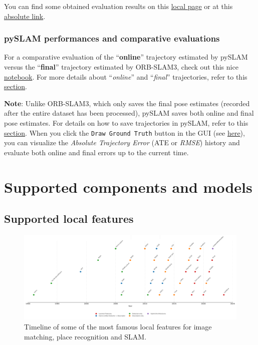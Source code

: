 \documentclass{article}
\begin{document}
You can find some obtained evaluation results on this 
\href{./docs/evaluations/evaluations.md}{local page} or at this \href{https://github.com/luigifreda/pyslam/blob/master/docs/evaluations/evaluations.md}{absolute link}.

\hypertarget{pyslam-performances-and-comparative-evaluations}{%
\subsubsection{pySLAM performances and comparative
evaluations}\label{pyslam-performances-and-comparative-evaluations}}

For a comparative evaluation of the ``\textbf{online}'' trajectory
estimated by pySLAM versus the ``\textbf{final}'' trajectory estimated
by ORB-SLAM3, check out this nice
\href{https://github.com/anathonic/Trajectory-Comparison-ORB-SLAM3-pySLAM/blob/main/trajectories_comparison.ipynb}{notebook}.
For more details about ``\emph{online}'' and ``\emph{final}''
trajectories, refer to this
\protect\hyperlink{trajectory-saving}{section}.

\textbf{Note}: Unlike ORB-SLAM3, which only saves the final pose
estimates (recorded after the entire dataset has been processed), pySLAM
saves both online and final pose estimates. For details on how to save
trajectories in pySLAM, refer to this
\protect\hyperlink{trajectory-saving}{section}. When you click the
\texttt{Draw\ Ground\ Truth} button in the GUI (see
\protect\hyperlink{slam-gui}{here}), you can visualize the
\emph{Absolute Trajectory Error} (ATE or \emph{RMSE}) history and
evaluate both online and final errors up to the current time.

\hypertarget{supported-components-and-models}{%
\section{Supported components and
models}\label{supported-components-and-models}}

\hypertarget{supported-local-features}{%
\subsection{Supported local
features}\label{supported-local-features}}

\begin{figure}[!t]
\begin{center}
    \includegraphics[width=\textwidth]{./images_tex/local_features_timeline.png}
\end{center}
\caption{Timeline of some of the most famous local features for image matching, place recognition and SLAM.}
\label{Fig_TimelineLocalFeatures}
\end{figure}
\end{document}
